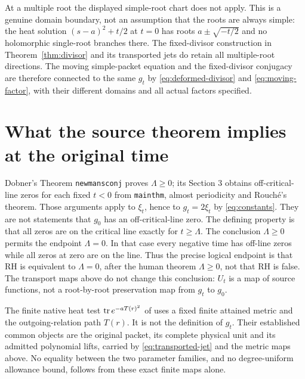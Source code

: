 \documentclass[11pt]{article}
\begin{document}
At a multiple root the displayed simple-root chart does not apply.
This is a genuine domain boundary, not an assumption that the roots
are always simple: the heat solution $(s-a)^2+t/2$ at $t=0$ has
roots $a\pm\sqrt{-t/2}$ and no holomorphic single-root branches
there. The fixed-divisor construction in
Theorem~\ref{thm:divisor} and its transported jets do retain all
multiple-root directions. The moving simple-packet equation and the
fixed-divisor conjugacy are therefore connected to the same $g_t$
by \eqref{eq:deformed-divisor} and \eqref{eq:moving-factor}, with
their different domains and all actual factors specified.

\section{What the source theorem implies at the original time}

Dobner's Theorem \texttt{newmansconj} proves $\Lambda\geq0$;
its Section 3 obtains off-critical-line zeros for each fixed $t<0$
from \texttt{mainthm}, almost periodicity and Rouch\'e's theorem.
Those arguments apply to $\xi_t$, hence to $g_t=2\xi_t$ by
\eqref{eq:constants}. They are not statements that $g_0$ has an
off-critical-line zero. The defining property is that all zeros
are on the critical line exactly for $t\geq\Lambda$.
The conclusion $\Lambda\geq0$ permits the endpoint $\Lambda=0$.
In that case every negative time has off-line zeros while all
zeros at zero are on the line. Thus the precise logical endpoint
is that RH is equivalent to $\Lambda=0$, after the human theorem
$\Lambda\geq0$, not that RH is false. The transport maps above
do not change this conclusion: $U_t$ is a map of source functions,
not a root-by-root preservation map from $g_t$ to $g_0$.

The finite native heat test $\operatorname{tr} e^{-aT(r)^2}$ of \cite{Native}
uses a fixed finite attained metric and the outgoing-relation path
$T(r)$. It is not the definition of $g_t$. Their established common
objects are the original packet, its complete physical unit and its
admitted polynomial lifts, carried by
\eqref{eq:transported-jet} and the metric maps above. No equality
between the two parameter families, and no degree-uniform allowance
bound, follows from these exact finite maps alone.
\end{document}
